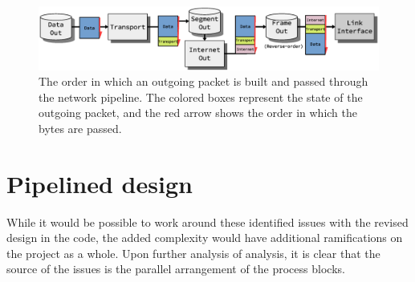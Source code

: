 \begin{figure}
    \centering
    \includegraphics[scale=0.45]{design/sending_packet_graph.eps}
    \caption{The order in which an outgoing packet is built and passed through the network pipeline.
    The colored boxes represent the state of the outgoing packet, and the red arrow
    shows the order in which the bytes are passed.}
    \label{fig:sending_packet_graph}
\end{figure}







\section{Pipelined design}
While it would be possible to work around these identified issues with the 
revised design in the code, the 
added complexity would have additional ramifications on the project as a whole.
Upon further analysis of analysis, it is clear that the source of the issues is 
the parallel arrangement of the process blocks.



